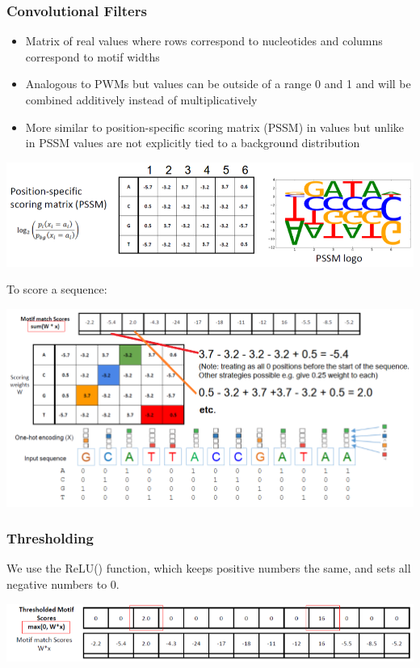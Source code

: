 \documentclass[10pt]{article}
\begin{document}
\subsubsection*{Convolutional Filters}
\begin{itemize}
	\item Matrix of real values where rows correspond to nucleotides and columns correspond to motif widths
	\item Analogous to PWMs but values can be outside of a range 0 and 1 and will be combined additively instead of multiplicatively
	\item More similar to position-specific scoring matrix (PSSM) in values but unlike in PSSM values are not explicitly tied to a background distribution
\end{itemize}
\begin{center} 
	\includegraphics*[width=\textwidth]{W8_14.png} 
\end{center}
To score a sequence:
\begin{center} 
	\includegraphics*[width=\textwidth]{W8_15.png} 
\end{center}

\subsubsection*{Thresholding}
We use the ReLU() function, which keeps positive numbers the same, and sets all negative numbers to 0.
\begin{center} 
	\includegraphics*[width=\textwidth]{W8_16.png} 
\end{center}
\end{document}
